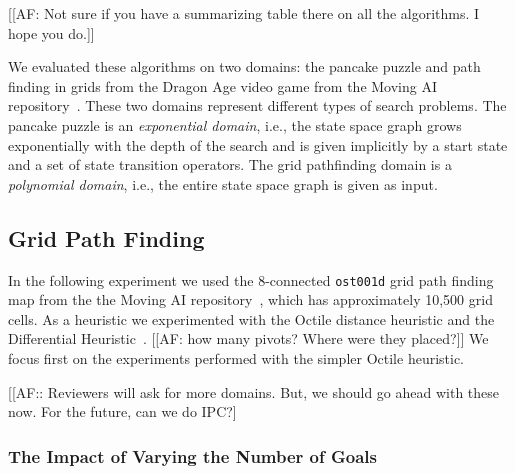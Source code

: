 \documentclass[twoside,11pt]{article}
\newcommand{\roni}[1]{\textbf{[RS:#1]}}
\begin{document}
[[AF: Not sure if you have a summarizing table there on all the algorithms. I hope you do.]]

We evaluated these algorithms on two domains: the pancake puzzle and path finding in grids from the Dragon Age video game from the Moving AI repository~\cite{sturtevant2012benchmarks}.
These two domains represent different types of search problems.
The pancake puzzle is an \emph{exponential domain}, i.e., the state space graph grows exponentially with the depth of the search and is given implicitly by a start state and a set of state transition
operators.
The grid pathfinding domain is a \emph{polynomial domain}, i.e., the entire state space graph is given as input. %

\subsection{Grid Path Finding}


In the following experiment we used the 8-connected \texttt{ost001d} grid path finding map from the the Moving AI repository~\cite{sturtevant2012benchmarks}, which has approximately 10,500 grid cells.
As a heuristic we experimented with the Octile distance heuristic and the Differential Heuristic~\cite{goldberg2005computing,ng2002predicting,SturtevantFBSN2009}. [[AF: how many pivots? Where were they placed?]]
We focus first on the experiments performed with the simpler Octile heuristic.

[[AF:: Reviewers will ask for more domains. But, we should go ahead with these now. For the future, can we do IPC?]

\subsubsection{The Impact of Varying the Number of Goals}
\end{document}
